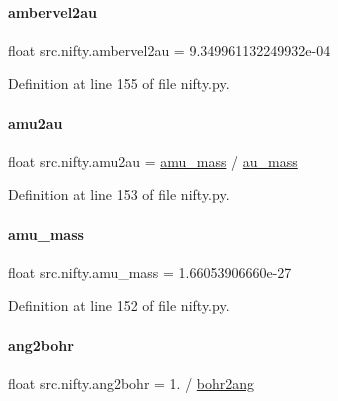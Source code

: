 \paragraph{\texorpdfstring{ambervel2au}{ambervel2au}}
{\footnotesize\ttfamily float src.\+nifty.\+ambervel2au = 9.\+349961132249932e-\/04}



Definition at line 155 of file nifty.\+py.

\mbox{\label{namespacesrc_1_1nifty_aa028dad85e8c12010da18e071e0f45dd}} 
\paragraph{\texorpdfstring{amu2au}{amu2au}}
{\footnotesize\ttfamily float src.\+nifty.\+amu2au = \hyperlink{namespacesrc_1_1nifty_ae95fc9903e17d173018422e81b48d682}{amu\+\_\+mass} / \hyperlink{namespacesrc_1_1nifty_aaa445cac2984fa47a49080735e5ceec7}{au\+\_\+mass}}



Definition at line 153 of file nifty.\+py.

\mbox{\label{namespacesrc_1_1nifty_ae95fc9903e17d173018422e81b48d682}} 
\paragraph{\texorpdfstring{amu\+\_\+mass}{amu\_mass}}
{\footnotesize\ttfamily float src.\+nifty.\+amu\+\_\+mass = 1.\+66053906660e-\/27}



Definition at line 152 of file nifty.\+py.

\mbox{\label{namespacesrc_1_1nifty_ae6ed06f09cc69631ba6edbad578f1fb5}} 
\paragraph{\texorpdfstring{ang2bohr}{ang2bohr}}
{\footnotesize\ttfamily float src.\+nifty.\+ang2bohr = 1. / \hyperlink{namespacesrc_1_1nifty_a4ce0e3b582ee58a4286a88bd46202002}{bohr2ang}}



